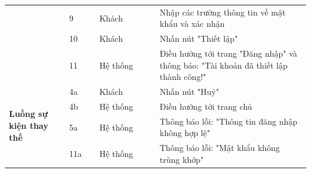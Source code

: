 \documentclass[../DoAn.tex]{subfiles}
\begin{document}
\begin{table}[ht]
\begin{tabular}{| p{0.2\linewidth} | p{0.1\linewidth} | p{0.2\linewidth} | p{0.5\linewidth} |}
                                                                     & \multicolumn{1}{p{0.1\linewidth}|}{9}                                                  & \multicolumn{1}{p{0.2\linewidth}|}{Khách}                  & \multicolumn{1}{p{0.5\linewidth}|}{Nhập các trường thông tin về mật khẩu và xác nhận}                                   \\ \cline{2-4}
                                                                     & \multicolumn{1}{p{0.1\linewidth}|}{10}                                                 & \multicolumn{1}{p{0.2\linewidth}|}{Khách}                  & \multicolumn{1}{p{0.5\linewidth}|}{Nhấn nút "Thiết lập"}                                                                \\ \cline{2-4}
                                                                     & \multicolumn{1}{p{0.1\linewidth}|}{11}                                                 & \multicolumn{1}{p{0.2\linewidth}|}{Hệ thống}               & \multicolumn{1}{p{0.5\linewidth}|}{Điều hướng tới trang "Đăng nhập" và thông báo: "Tài khoản đã thiết lập thành công!"} \\ \hline
        \multirow{4}{\linewidth}{\textbf{Luồng sự kiện thay thế}}    & \multicolumn{1}{p{0.1\linewidth}|}{4a}                                                 & \multicolumn{1}{p{0.2\linewidth}|}{Khách}                  & \multicolumn{1}{p{0.5\linewidth}|}{Nhấn nút "Huỷ"}                                                                      \\ \cline{2-4}
                                                                     & \multicolumn{1}{p{0.1\linewidth}|}{4b}                                                 & \multicolumn{1}{p{0.2\linewidth}|}{Hệ thống}               & \multicolumn{1}{p{0.5\linewidth}|}{Điều hướng tới trang chủ}                                                            \\ \cline{2-4}
                                                                     & \multicolumn{1}{p{0.1\linewidth}|}{5a}                                                 & \multicolumn{1}{p{0.2\linewidth}|}{Hệ thống}               & \multicolumn{1}{p{0.5\linewidth}|}{Thông báo lỗi: "Thông tin đăng nhập không hợp lệ"}                                   \\ \cline{2-4}
                                                                     & \multicolumn{1}{p{0.1\linewidth}|}{11a}                                                & \multicolumn{1}{p{0.2\linewidth}|}{Hệ thống}               & \multicolumn{1}{p{0.5\linewidth}|}{Thông báo lỗi: "Mật khẩu không trùng khớp"}                                          \\ \hline

\end{tabular}
\end{table}
\end{document}
